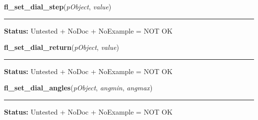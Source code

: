     \vspace{0.5ex}

\hspace{.8\funcindent}\begin{boxedminipage}{\funcwidth}

    \raggedright \textbf{fl\_set\_dial\_step}(\textit{pObject}, \textit{value})

    \vspace{-1.5ex}

    \rule{\textwidth}{0.5\fboxrule}
\setlength{\parskip}{2ex}
\setlength{\parskip}{1ex}
\textbf{Status:} Untested + NoDoc + NoExample = NOT OK



    \end{boxedminipage}

    \label{xformslib:library:fl_set_dial_return}

    \vspace{0.5ex}

\hspace{.8\funcindent}\begin{boxedminipage}{\funcwidth}

    \raggedright \textbf{fl\_set\_dial\_return}(\textit{pObject}, \textit{value})

    \vspace{-1.5ex}

    \rule{\textwidth}{0.5\fboxrule}
\setlength{\parskip}{2ex}
\setlength{\parskip}{1ex}
\textbf{Status:} Untested + NoDoc + NoExample = NOT OK



    \end{boxedminipage}

    \label{xformslib:library:fl_set_dial_angles}

    \vspace{0.5ex}

\hspace{.8\funcindent}\begin{boxedminipage}{\funcwidth}

    \raggedright \textbf{fl\_set\_dial\_angles}(\textit{pObject}, \textit{angmin}, \textit{angmax})

    \vspace{-1.5ex}

    \rule{\textwidth}{0.5\fboxrule}
\setlength{\parskip}{2ex}
\setlength{\parskip}{1ex}
\textbf{Status:} Untested + NoDoc + NoExample = NOT OK



    \end{boxedminipage}

